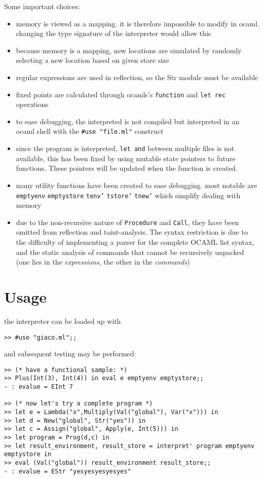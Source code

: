 \documentclass[11pt]{article}
\begin{document}
Some important choices:
\begin{itemize}
\item memory is viewed as a mapping. it is therefore impossible to modify in ocaml. changing the type signature of the interpreter would allow this
\item because memory is a mapping, new locations are simulated by randomly selecting a new location based on given store size
\item regular expressions are used in reflection, so the Str module must be available
\item fixed points are calculated through ocamls's \texttt{function} and \texttt{let rec} operations
\item to ease debugging, the interpreted is not compiled but interpreted in an ocaml shell with the \texttt{\#use "file.ml"} construct
\item since the program is interpreted, \texttt{let and} between multiple files is not available, this has been fixed by using mutable state pointers to future functions. These pointers will be updated
when the function is created.
\item many utility functions have been created to ease debugging. most notable are \texttt{emptyenv} \texttt{emptystore} \texttt{tenv'} \texttt{tstore'} \texttt{tnew'} which simplify dealing with memory
\item due to the non-recursive nature of \texttt{Procedure} and \texttt{Call}, they have been omitted from reflection and taint-analysis. The syntax restriction is due to the difficulty of implementing a parser 
for the complete OCAML list syntax, and the static analysis of commands that cannot be recursively unpacked (one lies in the \emph{expressions}, the other in the \emph{commands})
\end{itemize}
\section{Usage}
\label{sec:org1649f85}
the interpreter can be loaded up with
\begin{verbatim}
>> #use "giaco.ml";;
\end{verbatim}

and subsequent testing may be performed:
\begin{verbatim}
>> (* have a functional sample: *)
>> Plus(Int(3), Int(4)) in eval e emptyenv emptystore;;
- : evalue = EInt 7

>> (* now let's try a complete program *)
>> let e = Lambda("x",Multiply(Val("global"), Var("x"))) in
>> let d = New("global", Str("yes")) in
>> let c = Assign("global", Apply(e, Int(5))) in
>> let program = Prog(d,c) in
>> let result_environment, result_store = interpret' program emptyenv emptystore in
>> eval (Val("global")) result_environment result_store;;
- : evalue = EStr "yesyesyesyesyes"
\end{verbatim}
\end{document}
